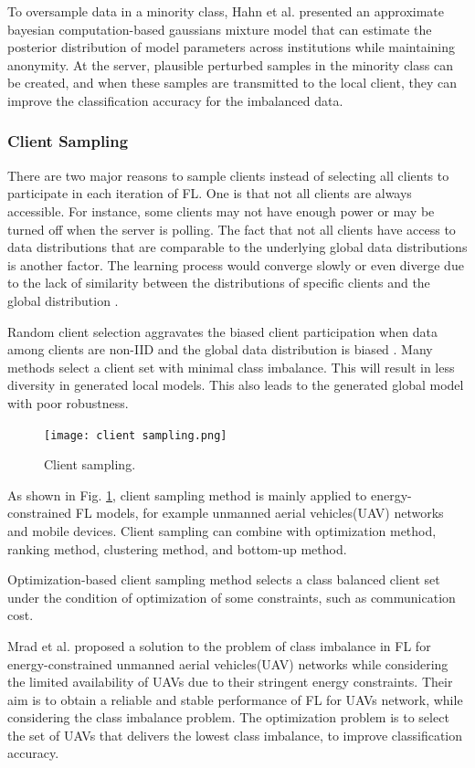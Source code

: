 \documentclass[10pt,journal,compsoc]{IEEEtran}
\begin{document}
	To oversample data in a minority class, Hahn et al. \cite{hahn2019privacy} presented an approximate bayesian computation-based gaussians mixture model that can estimate the posterior distribution of model parameters across institutions while maintaining anonymity. At the server, plausible perturbed samples in the minority class can be created, and when these samples are transmitted to the local client, they can improve the classification accuracy for the imbalanced data.
	
	\subsubsection{Client Sampling}
	There are two major reasons to sample clients instead of selecting all clients to participate in each iteration of FL. One is that not all clients are always accessible. For instance, some clients may not have enough power or may be turned off when the server is polling. The fact that not all clients have access to data distributions that are comparable to the underlying global data distributions is another factor. The learning process would converge slowly or even diverge due to the lack of similarity between the distributions of specific clients and the global distribution \cite{chen2021novel} \cite{goetz2019active}. 
	
	Random client selection aggravates the biased client participation when data among clients are non-IID and the global data distribution is biased \cite{zhang2021dubhe}. Many methods select a client set with minimal class imbalance. This will result in less diversity in generated local models. This also leads to the generated global model with poor robustness. 
	
	\begin{figure}[h]
		\centering
		\texttt{[image: client sampling.png]}
		\caption{Client sampling.}
		\label{Client sampling}
	\end{figure}
	
	As shown in Fig. \ref{Client sampling}, client sampling method is mainly applied to energy-constrained FL models, for example unmanned aerial vehicles(UAV) networks and mobile devices. Client sampling can combine with optimization method, ranking method, clustering method, and bottom-up method. 
	
	Optimization-based client sampling method selects a class balanced client set under the condition of optimization of some constraints, such as communication cost. 
	
	Mrad et al. \cite{mrad2021federated} proposed a solution to the problem of class imbalance in FL for energy-constrained unmanned aerial vehicles(UAV) networks while considering the limited availability of UAVs due to their stringent energy constraints. Their aim is to obtain a reliable and stable performance of FL for UAVs network, while considering the class imbalance problem. The optimization problem is to select the set of UAVs that delivers the lowest class imbalance, to improve classification accuracy.
	
\end{document}
